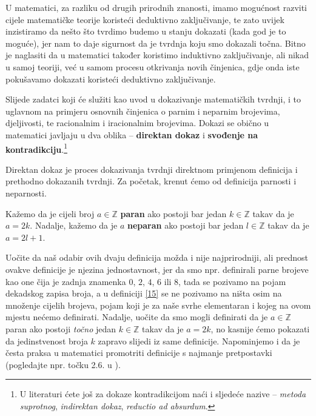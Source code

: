U matematici, za razliku od drugih prirodnih znanosti, imamo mogućnost razviti cijele matematičke teorije koristeći deduktivno zaključivanje, te zato uvijek inzistiramo da nešto što tvrdimo budemo u stanju dokazati (kada god je to moguće), jer nam to daje sigurnost da je tvrdnja koju smo dokazali točna. Bitno je naglasiti da u matematici također koristimo induktivno zaključivanje, ali nikad u samoj teoriji, već u samom procesu otkrivanja novih činjenica, gdje onda iste pokušavamo dokazati koristeći deduktivno zaključivanje. 

Slijede zadatci koji će služiti kao uvod u dokazivanje matematičkih tvrdnji, i to uglavnom na primjeru osnovnih činjenica o parnim i neparnim brojevima, djeljivosti, te racionalnim i iracionalnim brojevima. Dokazi se obično u matematici javljaju u dva oblika -- \textbf{direktan dokaz} i \textbf{svođenje na kontradikciju}.\footnote{U literaturi ćete još za dokaze kontradikcijom naći i sljedeće nazive -- \textit{metoda suprotnog}, \textit{indirektan dokaz}, \textit{reductio ad absurdum}.}

Direktan dokaz je proces dokazivanja tvrdnji direktnom primjenom definicija i prethodno dokazanih tvrdnji. Za početak, krenut ćemo od definicija parnosti i neparnosti.

\begin{definition}
\label{15}
Kažemo da je cijeli broj $a\in \mathbb{Z}$ \textbf{paran} ako postoji bar jedan $k\in \mathbb{Z}$ takav da je $a=2k$. Nadalje, kažemo da je $a$ \textbf{neparan} ako postoji bar jedan $l\in \mathbb{Z}$ takav da je $a=2l+1$.
\end{definition}

Uočite da naš odabir ovih dvaju definicija možda i nije najprirodniji, ali prednost ovakve definicije je njezina jednostavnost, jer da smo npr. definirali parne brojeve kao one čija je zadnja znamenka $0$, $2$, $4$, $6$ ili $8$, tada se pozivamo na pojam dekadskog zapisa broja, a u definiciji \ref{15} se ne pozivamo na ništa osim na množenje cijelih brojeva, pojam koji je za naše svrhe elementaran i kojeg na ovom mjestu nećemo definirati. Nadalje, uočite da smo mogli definirati da je $a\in \mathbb{Z}$ paran ako postoji \textit{točno} jedan $k\in \mathbb{Z}$ takav da je $a=2k$, no kasnije ćemo pokazati da jedinstvenost broja $k$ zapravo slijedi iz same definicije. Napominjemo i da je česta praksa u matematici promotriti definicije s najmanje pretpostavki (pogledajte npr. točku 2.6. u \cite{2}).

